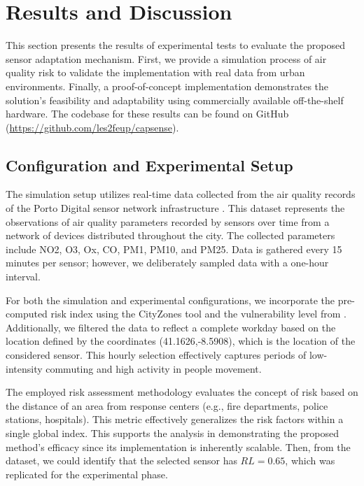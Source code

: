 \documentclass[conference]{IEEEtran}
\begin{document}
\section{Results and Discussion}
\label{sec:results}
This section presents the results of experimental tests to evaluate the proposed sensor adaptation mechanism. First, we provide a simulation process of air quality risk to validate the implementation with real data from urban environments. Finally, a proof-of-concept implementation demonstrates the solution's feasibility and adaptability using commercially available off-the-shelf hardware.%
The codebase for these results can be found on GitHub (\url{https://github.com/les2feup/capsense}).

\subsection{Configuration and Experimental Setup}

The simulation setup utilizes real-time data collected from the air quality records of the Porto Digital sensor network infrastructure \cite{dadosPorto2025}. This dataset represents the observations of air quality parameters recorded by sensors over time from a network of devices distributed throughout the city. The collected parameters include NO2, O3, Ox, CO, PM1, PM10, and PM25. Data is gathered every 15 minutes per sensor; however, we deliberately sampled data with a one-hour interval.

For both the simulation and experimental configurations, we incorporate the pre-computed risk index using the CityZones tool \cite{peixotoCityZonesGeospatialMultitier2023} and the vulnerability level from \cite{bittencourtDatadrivenClusteringApproach2024}. Additionally, we filtered the data to reflect a complete workday based on the location defined by the coordinates (41.1626,-8.5908), which is the location of the considered sensor. This hourly selection effectively captures periods of low-intensity commuting and high activity in people movement.

The employed risk assessment methodology evaluates the concept of risk based on the distance of an area from response centers (e.g., fire departments, police stations, hospitals). This metric effectively generalizes the risk factors within a single global index. This supports the analysis in demonstrating the proposed method's efficacy since its implementation is inherently scalable. Then, from the dataset, we could identify that the selected sensor has \( RL = 0.65 \), which was replicated for the experimental phase.
\end{document}
